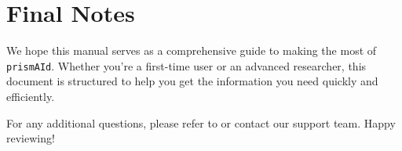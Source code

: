 \section*{Final Notes}

We hope this manual serves as a comprehensive guide to making the most of \texttt{prismAId}. Whether you're a first-time user or an advanced researcher, this document is structured to help you get the information you need quickly and efficiently.
  

For any additional questions, please refer to  or contact our support team. Happy reviewing!

